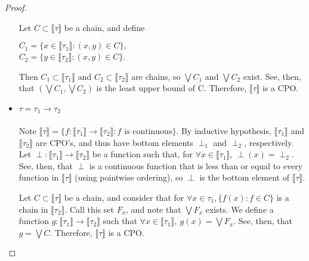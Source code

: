 \documentclass{westhesis}
\theoremstyle{plain}
\theoremstyle{definition}
\begin{document}
\begin{master}
\begin{proof}
\begin{itemize}
Let $C \subset \llbracket \tau \rrbracket$ be a
chain, and define
\begin{center}
$C_1 = \{x \in \llbracket \tau_1 \rrbracket : (x,y) \in C\},$ \\
$C_2 = \{ y \in \llbracket \tau_2 \rrbracket: (x,y) \in C\}$. \\ 
\end{center}
Then $C_1 \subset \llbracket \tau_1 \rrbracket$ and $C_2 \subset \llbracket \tau_2 \rrbracket$ are chains, so $\bigvee C_1$
and $\bigvee C_2$ exist. See, then, that $(\bigvee C_1, \bigvee C_2)$ is the least upper bound of C. Therefore, $\llbracket 
\tau \rrbracket$ is a CPO.
\item $\tau = \tau_1 \rightarrow \tau_2$ \\ \\
Note $\llbracket \tau \rrbracket = \{f : \llbracket \tau_1 \rrbracket \rightarrow \llbracket \tau_2 \rrbracket : f \text{ is continuous}\}
$. By inductive hypothesis, $\llbracket \tau_1 \rrbracket$ and $\llbracket \tau_2 \rrbracket$ are CPO's, and thus have bottom
elements $\perp_1$ and $\perp_2$, respectively. Let $\perp: \llbracket \tau_1 \rrbracket \rightarrow \llbracket \tau_2 
\rrbracket$ be a function such that, for $\forall x \in \llbracket \tau_1 \rrbracket, \ \perp(x) = \perp_2$. See, then, that 
$\perp$ is a continuous function that is less than or equal to every function in $\llbracket \tau \rrbracket$ (using pointwise
ordering), so $\perp$ is the bottom element of $\llbracket \tau \rrbracket$.  

Let $C \subset \llbracket \tau \rrbracket$ be a 
chain, and consider that for $\forall x \in \tau_1, \{f(x) : f \in C\}$ is a chain in $\llbracket \tau_2 \rrbracket$. Call this set $F_x$,
and note that $\bigvee F_x$ exists. We define a function $g: \llbracket \tau_1 \rrbracket \rightarrow \llbracket \tau_2 \rrbracket$ 
such that $\forall x \in \llbracket \tau_1 \rrbracket, \ g(x) = \bigvee F_x$. See, then, that $g = \bigvee C$. Therefore, $\llbracket
\tau \rrbracket$ is a CPO. \\
\end{itemize} 
\end{proof}
%

\end{master}
\end{document}
